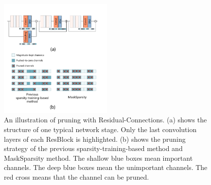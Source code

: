 \documentclass[review]{cvpr}
\begin{document}
   
\begin{figure}[h!]
	\begin{centering}
		\includegraphics[width=0.5\textwidth]{figure/resduial_prune.pdf}
		\caption{
			An illustration of pruning with Residual-Connections.
			(a) shows the structure of one typical network stage. Only the last convolution layers of each ResBlock is highlighted. 
			(b) shows the pruning strategy of the previous sparsity-training-based method and MaskSparsity method.
			The shallow blue boxes mean important channels.
			The deep blue boxes mean the unimportant channels.
			The red cross means that the channel can be pruned.
		}
	    \label{Pruningmask-method}
	\end{centering}
    
\end{figure}
\end{document}
